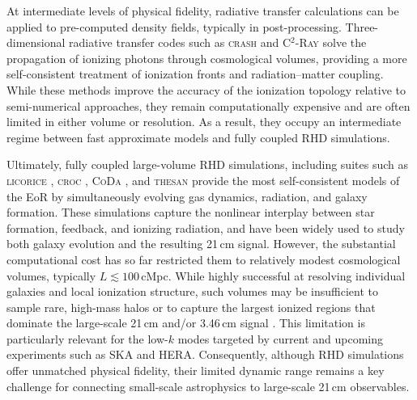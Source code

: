 \documentclass[apj,twocolumn, appendixfloats, twocolappendix, numberedappendix, tighten]{openjournal}
\begin{document}
At intermediate levels of physical fidelity, radiative transfer calculations can be applied to pre-computed density fields, typically in post-processing. Three-dimensional radiative transfer codes such as \textsc{crash} \citep[][]{vanderHolst2011} and \textsc{C$^2$-Ray} \citep[][]{Mellema2006} solve the propagation of ionizing photons through cosmological volumes, providing a more self-consistent treatment of ionization fronts and radiation--matter coupling. While these methods improve the accuracy of the ionization topology relative to semi-numerical approaches, they remain computationally expensive and are often limited in either volume or resolution. As a result, they occupy an intermediate regime between fast approximate models and fully coupled RHD simulations.

Ultimately, fully coupled large-volume RHD simulations, including suites such as \textsc{licorice} \citep[][]{Semelin2007, Semelin2017, Baek2009}, \textsc{croc} \citep[][]{Gnedin2014a, Gnedin2014b, Kaurov2016}, \textsc{CoDa} \citep[][]{Ocvirk2016, Ocvirk2020}, and \textsc{thesan} \citep[][]{Kannan2022, Garaldi2022, Garaldi2024, Smith2022} provide the most self-consistent models of the EoR by simultaneously evolving gas dynamics, radiation, and galaxy formation. These simulations capture the nonlinear interplay between star formation, feedback, and ionizing radiation, and have been widely used to study both galaxy evolution and the resulting 21\,cm signal. However, the substantial computational cost has so far restricted them to relatively modest cosmological volumes, typically $L \lesssim 100$\,cMpc. While highly successful at resolving individual galaxies and local ionization structure, such volumes may be insufficient to sample rare, high-mass halos or to capture the largest ionized regions that dominate the large-scale 21\,cm and/or 3.46\,cm signal \citep[][]{Iliev2014}. This limitation is particularly relevant for the low-$k$ modes targeted by current and upcoming experiments such as SKA and HERA. Consequently, although RHD simulations offer unmatched physical fidelity, their limited dynamic range remains a key challenge for connecting small-scale astrophysics to large-scale 21\,cm observables.

\end{document}
